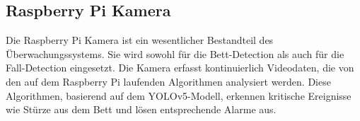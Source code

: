 
\subsection{Raspberry Pi Kamera}
Die Raspberry Pi Kamera ist ein wesentlicher Bestandteil des Überwachungssystems. Sie wird sowohl für die Bett-Detection als auch für die Fall-Detection eingesetzt. Die Kamera erfasst kontinuierlich Videodaten, die von den auf dem Raspberry Pi laufenden Algorithmen analysiert werden. Diese Algorithmen, basierend auf dem YOLOv5-Modell, erkennen kritische Ereignisse wie Stürze aus dem Bett und lösen entsprechende Alarme aus.
